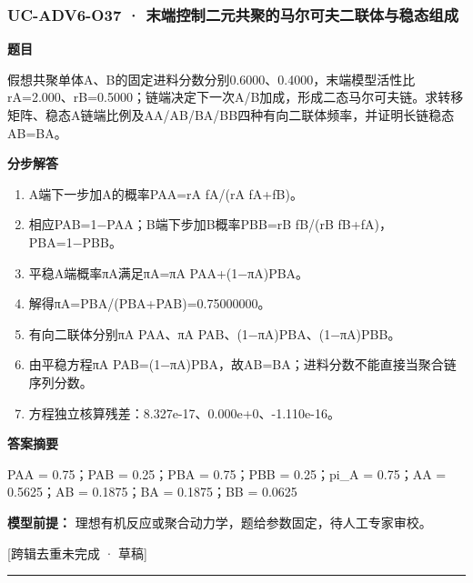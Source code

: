 \documentclass[UTF8,11pt,a4paper]{ctexart}
\begin{document}
\subsubsection*{UC-ADV6-O37 · 末端控制二元共聚的马尔可夫二联体与稳态组成}
\noindent\textbf{题目}\par
假想共聚单体A、B的固定进料分数分别0.6000、0.4000，末端模型活性比rA=2.000、rB=0.5000；链端决定下一次A/B加成，形成二态马尔可夫链。求转移矩阵、稳态A链端比例及AA/AB/BA/BB四种有向二联体频率，并证明长链稳态AB=BA。\par
\medskip\noindent\textbf{分步解答}
\begin{enumerate}
\item A端下一步加A的概率PAA=rA fA/(rA fA+fB)。
\item 相应PAB=1−PAA；B端下步加B概率PBB=rB fB/(rB fB+fA)，PBA=1−PBB。
\item 平稳A端概率πA满足πA=πA PAA+(1−πA)PBA。
\item 解得πA=PBA/(PBA+PAB)=0.75000000。
\item 有向二联体分别πA PAA、πA PAB、(1−πA)PBA、(1−πA)PBB。
\item 由平稳方程πA PAB=(1−πA)PBA，故AB=BA；进料分数不能直接当聚合链序列分数。
\item 方程独立核算残差：8.327e-17、0.000e+0、-1.110e-16。
\end{enumerate}
\noindent\textbf{答案摘要}\par
PAA = 0.75；PAB = 0.25；PBA = 0.75；PBB = 0.25；pi\_A = 0.75；AA = 0.5625；AB = 0.1875；BA = 0.1875；BB = 0.0625\par
\noindent\textbf{模型前提：}
理想有机反应或聚合动力学，题给参数固定，待人工专家审校。\par
\noindent\textcolor{red!65!black}{[跨辑去重未完成 · 草稿]} \par
\medskip\hrule\medskip
{}
\end{document}
